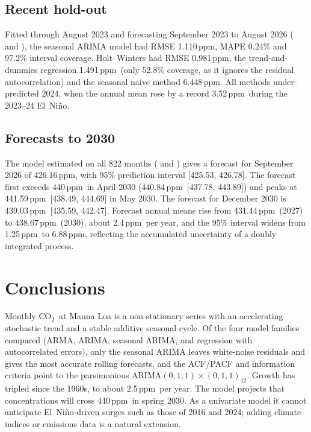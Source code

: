 \documentclass[11pt,letterpaper]{article}
\newcommand{\co}{CO$_2$}
\newcommand{\ppm}{\,ppm}
\begin{document}
\subsection{Recent hold-out}
Fitted through August 2023 and forecasting September 2023 to August 2026 ( and ), the seasonal ARIMA model had RMSE 1.110\ppm, MAPE 0.24\% and 97.2\% interval coverage. Holt--Winters had RMSE 0.981\ppm, the trend-and-dummies regression 1.491\ppm\ (only 52.8\% coverage, as it ignores the residual autocorrelation) and the seasonal naive method 6.448\ppm. All methods under-predicted 2024, when the annual mean rose by a record 3.52\ppm\ during the 2023--24 El~Ni\~no.

\subsection{Forecasts to 2030}
The model estimated on all 822 months ( and ) gives a forecast for September 2026 of 426.16\ppm, with 95\% prediction interval [425.53, 426.78]. The forecast first exceeds 440\ppm\ in April 2030 (440.84\ppm\ [437.78, 443.89]) and peaks at 441.59\ppm\ [438.49, 444.69] in May 2030. The forecast for December 2030 is 439.03\ppm\ [435.59, 442.47]. Forecast annual means rise from 431.44\ppm\ (2027) to 438.67\ppm\ (2030), about 2.4\ppm\ per year, and the 95\% interval widens from 1.25\ppm\ to 6.88\ppm, reflecting the accumulated uncertainty of a doubly integrated process.

\section{Conclusions}
Monthly \co\ at Mauna Loa is a non-stationary series with an accelerating stochastic trend and a stable additive seasonal cycle. Of the four model families compared (ARMA, ARIMA, seasonal ARIMA, and regression with autocorrelated errors), only the seasonal ARIMA leaves white-noise residuals and gives the most accurate rolling forecasts, and the ACF/PACF and information criteria point to the parsimonious ARIMA$(0,1,1)\times(0,1,1)_{12}$. Growth has tripled since the 1960s, to about 2.5\ppm\ per year. The model projects that concentrations will cross 440\ppm\ in spring 2030. As a univariate model it cannot anticipate El~Ni\~no-driven surges such as those of 2016 and 2024; adding climate indices or emissions data is a natural extension.

\vspace{1pt}


{\small}
\end{document}
